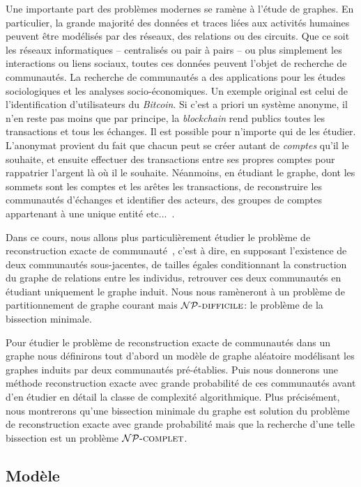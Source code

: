 \documentclass{standalone}
\begin{document}
Une importante part des problèmes modernes se ramène à l'étude de graphes. En particulier, la grande majorité des données et traces liées aux activités humaines peuvent être modélisés par des réseaux, des relations ou des circuits. Que ce soit les réseaux informatiques -- centralisés ou pair à pairs -- ou plus simplement les interactions ou liens sociaux, toutes ces données peuvent l'objet de recherche de communautés. La recherche de communautés a des applications pour les études sociologiques et les analyses socio-économiques. Un exemple original est celui de l'identification d'utilisateurs du \emph{Bitcoin}. Si c'est a priori un système anonyme, il n'en reste pas moins que par principe, la \emph{blockchain} rend publics toutes les transactions et tous les échanges. Il est possible pour n'importe qui de les étudier. L'anonymat provient du fait que chacun peut se créer autant de \textit{comptes} qu'il le souhaite, et ensuite effectuer des transactions entre ses propres comptes pour rappatrier l'argent là où il le souhaite. Néanmoins, en étudiant le graphe, dont les sommets sont les comptes et les arêtes les transactions, de reconstruire les communautés d'échanges et identifier des acteurs, des groupes de comptes appartenant à une unique entité etc...~\cite{bitcoin}.

Dans ce cours, nous allons plus particulièrement étudier le problème de reconstruction exacte de communauté~\cite{dyier}, c'est à dire, en supposant l'existence de deux communautés sous-jacentes, de tailles égales conditionnant la construction du graphe de relations entre les individus, retrouver ces deux communautés en étudiant uniquement le graphe induit. Nous nous ramèneront à un problème de partitionnement de graphe courant mais $\mathcal{NP}\text{\textsc{-difficile}}$: le problème de la bissection minimale. 

Pour étudier le problème de reconstruction exacte de communautés dans un graphe nous définirons tout d'abord un modèle de graphe aléatoire modélisant les graphes induits par deux communautés pré-établies. Puis nous donnerons une méthode reconstruction exacte avec grande probabilité de ces communautés avant d'en étudier en détail la classe de complexité algorithmique. Plus précisément, nous montrerons qu'une bissection minimale du graphe est solution du problème de reconstruction exacte avec grande probabilité mais que la recherche d'une telle bissection est un problème $\mathcal{NP}\text{\textsc{-complet}}$.
	
\subsection{Modèle}
\end{document}

